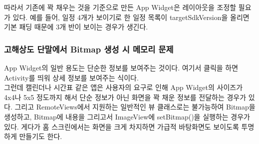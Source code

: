 따라서 기존에 꽉 채우는 것을 기준으로 만든 App Widget은 레이아웃을 조정할 필요가 있다. 예를 들어, 일정 4개가 보이기로 한 일정 목록이 targetSdkVersion을 올리면 기본 패딩 때문에 3개 반이 보이는 경우가 생긴다.

\subsubsection{고해상도 단말에서 Bitmap 생성 시 메모리 문제}
App Widget의 일반 용도는 단순한 정보를 보여주는 것이다. 여기서 클릭을 하면 Activity를 띄워 상세 정보를 보여주는 식이다.\\

그런데 캘린더나 시간표 같은 앱은 사용자의 요구로 인해 App Widget의 사이즈가 4x4나 5x5 정도까지 해서 단순 정보가 아닌 화면을 꽉 채운 정보를 전달하는 경우가 있다.
그리고 RemoteViews에서 지원하는 일반적인 뷰 클래스로는 불가능하여 Bitmap을 생성하고, Bitmap에 내용을 그리고서 ImageView에 setBitmap()을 실행하는 경우가 있다.
게다가 홈 스크린에서는 화면을 크게 차지하면 가급적 바탕화면도 보이도록 투명하게 만들기도 한다.\\

